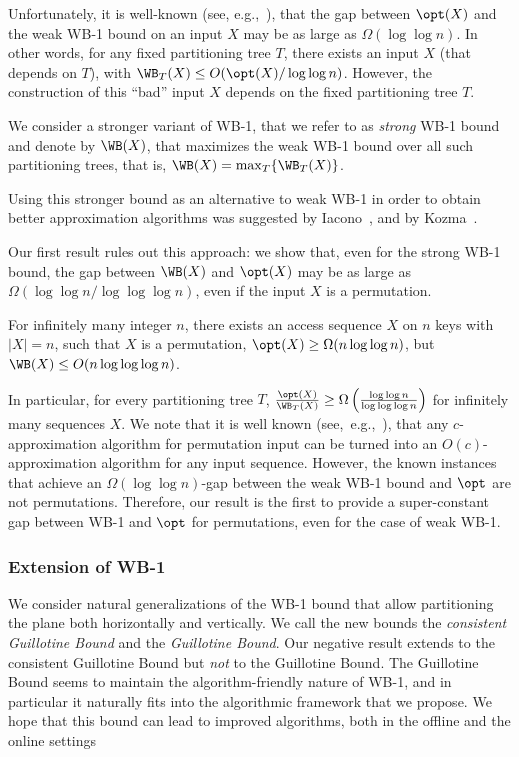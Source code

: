 \documentclass{toc}
\begin{document}
Unfortunately, it is well-known (see, e.g.,~\cite{tango,multisplay,in_pursuit}), that the gap between $\opt(X)$
and the weak WB-1 bound on an input $X$ may be as large as  $\Omega(\log\log n)$. 
In other words, for any fixed partitioning tree $T$, there exists an input $X$ (that depends on $T$),  with $\WB_{T}(X)\leq O(\opt(X)/\log\log n)$.
However, the construction of this ``bad'' input $X$  depends on the fixed partitioning tree $T$. 


We consider a stronger variant of WB-1, that we refer to as \emph{strong} WB-1 bound and denote by $\WB(X)$, that maximizes the weak WB-1 bound over all such partitioning trees, that is, $\WB(X)=\max_{T}\{\WB_{T}(X)\}$. 


Using this stronger bound as an alternative to weak WB-1 in order to obtain better approximation algorithms was suggested by Iacono~\cite{in_pursuit}, and by Kozma~\cite{Kozma16_thesis}.



 
Our first result rules out this approach: we show that, even for the strong WB-1 bound, the gap between $\WB(X)$ and $\opt(X)$ may be as large as $\Omega(\log\log n/\log\log\log n)$, even if the input $X$ is a permutation. 


%
%
\begin{theorem}
	\label{thm:intro_WB}
	For infinitely many integer $n$, there exists
	an access sequence $X$ on $n$ keys with $|X|=n$, such that $X$ is a permutation, $\opt(X)\geq \Omega(n\log\log n)$, but $\WB(X)\leq O(n\log\log\log n)$.
\end{theorem}

In particular, for every partitioning tree $T$, $\frac{\opt(X)}{\WB_{T}(X)}\geq \Omega\left(\frac{\log\log n}{\log\log\log n}\right )$ for infinitely many sequences $X$.
We note that it is well known  (see,~e.g.,~\cite{FOCS15}), that any $c$-approximation algorithm for permutation input can be turned into an $O(c)$-approximation algorithm for any input sequence. However, the known instances that achieve an $\Omega(\log\log n)$-gap between the weak WB-1 bound and $\opt$ are not permutations. Therefore, our result is the first to provide a super-constant gap between WB-1 and $\opt$ for permutations, even for the case of weak WB-1.



\subsubsection{Extension of WB-1}
\label{sec:extension-intro} 
We consider natural generalizations of the WB-1 bound that allow partitioning the plane both horizontally and vertically. We call the new bounds the \emph{consistent Guillotine Bound} and the \emph{Guillotine Bound}. 
Our negative result extends to the consistent Guillotine Bound but \emph{not} to the Guillotine Bound. The Guillotine Bound seems to maintain the  algorithm-friendly nature of WB-1, and in particular it naturally fits into the algorithmic framework that we propose. We hope that this bound can lead to improved algorithms, both in the offline and the online settings
\end{document}
